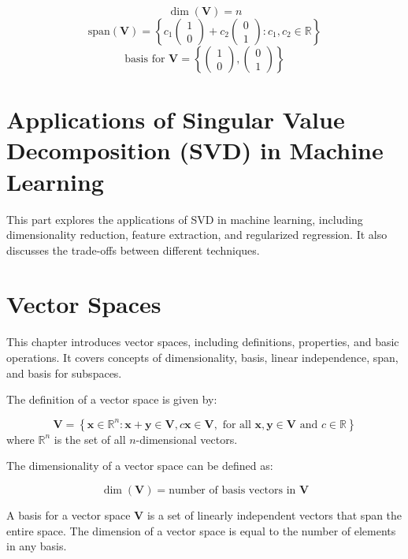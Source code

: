 \documentclass{report}%
\begin{document}
\[
\dim(\mathbf{V}) = n
\]
\[
\text{span}(\mathbf{V}) = \left\{ c_1\begin{pmatrix} 1 \\ 0 \end{pmatrix} + c_2\begin{pmatrix} 0 \\ 1 \end{pmatrix} : c_1, c_2 \in \mathbb{R} \right\}
\]
\[
\text{basis for }\mathbf{V} = \left\{ \begin{pmatrix} 1 \\ 0 \end{pmatrix}, \begin{pmatrix} 0 \\ 1 \end{pmatrix} \right\}
\]%
\section{Applications of Singular Value Decomposition (SVD) in Machine Learning}%
This part explores the applications of SVD in machine learning, including dimensionality reduction, feature extraction, and regularized regression. It also discusses the trade-offs between different techniques.

%
\section*{Vector Spaces}

This chapter introduces vector spaces, including definitions, properties, and basic operations. It covers concepts of dimensionality, basis, linear independence, span, and basis for subspaces.

The definition of a vector space is given by:

\[
 \mathbf{V} = \left\{ \mathbf{x} \in \mathbb{R}^n : \mathbf{x} + \mathbf{y} \in \mathbf{V}, c\mathbf{x} \in \mathbf{V}, \text{ for all } \mathbf{x}, \mathbf{y} \in \mathbf{V} \text{ and } c \in \mathbb{R} \right\}
\]
where $\mathbb{R}^n$ is the set of all $n$-dimensional vectors.

The dimensionality of a vector space can be defined as:

\[
\dim(\mathbf{V}) = \text{number of basis vectors in }\mathbf{V}
\]

A basis for a vector space $\mathbf{V}$ is a set of linearly independent vectors that span the entire space. The dimension of a vector space is equal to the number of elements in any basis.
\end{document}
